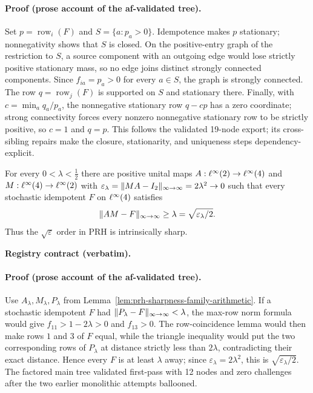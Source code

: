 \paragraph{Proof (prose account of the af-validated tree).}
Set $p=\operatorname{row}_i(F)$ and $S=\{a:p_a>0\}$.  Idempotence makes $p$ stationary;
nonnegativity shows that $S$ is closed.  On the positive-entry graph of the restriction to
$S$, a source component with an outgoing edge would lose strictly positive stationary mass,
so no edge joins distinct strongly connected components.  Since $f_{ia}=p_a>0$ for every
$a\in S$, the graph is strongly connected.  The row $q=\operatorname{row}_j(F)$ is supported
on $S$ and stationary there.  Finally, with $c=\min_a q_a/p_a$, the nonnegative stationary
row $q-cp$ has a zero coordinate; strong connectivity forces every nonzero nonnegative
stationary row to be strictly positive, so $c=1$ and $q=p$.  This follows the validated
19-node export; its cross-sibling repairs make the closure, stationarity, and uniqueness
steps dependency-explicit.

\begin{lemma}\label{lem:prh-sharpness}
For every $0<\lambda<\tfrac12$ there are positive unital maps
$A:\ell^{\infty}(2)\to\ell^{\infty}(4)$ and $M:\ell^{\infty}(4)\to\ell^{\infty}(2)$ with
$\varepsilon_\lambda=\lVert MA-I_2 \rVert_{\infty\to\infty}=2\lambda^2\to0$ such that every stochastic
idempotent $F$ on $\ell^{\infty}(4)$ satisfies
\[
\lVert AM-F \rVert_{\infty\to\infty}\ge\lambda=\sqrt{\varepsilon_\lambda/2}.
\]
Thus the $\sqrt\varepsilon$ order in PRH is intrinsically sharp.
\end{lemma}

\noindent\textbf{Registry contract (verbatim).}

\paragraph{Proof (prose account of the af-validated tree).}
Use $A_\lambda,M_\lambda,P_\lambda$ from Lemma~\ref{lem:prh-sharpness-family-arithmetic}.
If a stochastic idempotent $F$ had $\lVert P_\lambda-F \rVert_{\infty\to\infty}<\lambda$, the max-row norm
formula would give $f_{11}>1-2\lambda>0$ and $f_{13}>0$.  The row-coincidence lemma would
then make rows $1$ and $3$ of $F$ equal, while the triangle inequality would put the two
corresponding rows of $P_\lambda$ at distance strictly less than $2\lambda$, contradicting
their exact distance.  Hence every $F$ is at least $\lambda$ away; since
$\varepsilon_\lambda=2\lambda^2$, this is $\sqrt{\varepsilon_\lambda/2}$.  The factored
main tree validated first-pass with 12 nodes and zero challenges after the two earlier
monolithic attempts ballooned.


